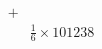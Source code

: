 \documentclass[preview]{standalone}
\begin{document}
\begin{align*}
+&\\&\frac{1}{6}\times101238
\end{align*}
\end{document}
